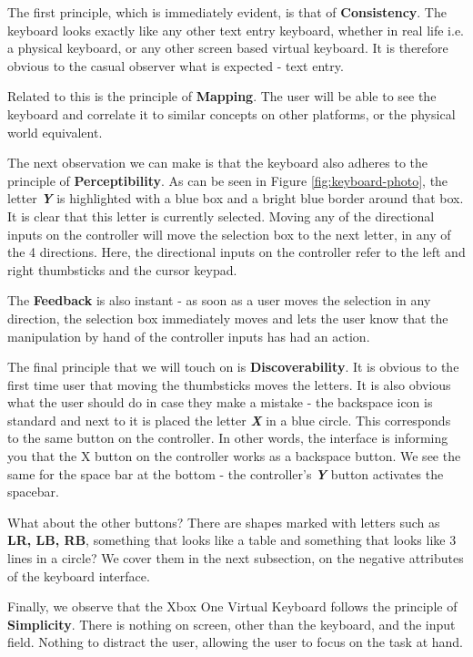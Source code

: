 \documentclass[
	letterpaper, %
]{jdf}
\begin{document}
The first principle, which is immediately evident, is that of \textbf{Consistency}. The keyboard looks exactly like any other text entry keyboard, whether in real life i.e. a physical keyboard, or any other screen based virtual keyboard. It is therefore obvious to the casual observer what is expected - text entry. 

Related to this is the principle of \textbf{Mapping}. The user will be able to see the keyboard and correlate it to similar concepts on other platforms, or the physical world equivalent.

The next observation we can make is that the keyboard also adheres to the principle of \textbf{Perceptibility}. As can be seen in Figure \ref{fig:keyboard-photo}, the letter \textbf{\textit{Y}} is highlighted with a blue box and a bright blue border around that box. It is clear that this letter is currently selected. Moving any of the directional inputs on the controller will move the selection box to the next letter, in any of the 4 directions. Here, the directional inputs on the controller refer to the left and right thumbsticks and the cursor keypad.

The \textbf{Feedback} is also instant - as soon as a user moves the selection in any direction, the selection box immediately moves and lets the user know that the manipulation by hand of the controller inputs has had an action.

The final principle that we will touch on is \textbf{Discoverability}. It is obvious to the first time user that moving the thumbsticks moves the letters. It is also obvious what the user should do in case they make a mistake - the backspace icon is standard and next to it is placed the letter \textbf{\textit{X}} in a blue circle. This corresponds to the same button on the controller. In other words, the interface is informing you that the X button on the controller works as a backspace button. We see the same for the space bar at the bottom - the controller's \textbf{\textit{Y}} button activates the spacebar.

What about the other buttons? There are shapes marked with letters such as \textbf{LR, LB, RB}, something that looks like a table and something that looks like 3 lines in a circle? We cover them in the next subsection, on the negative attributes of the keyboard interface.

Finally, we observe that the Xbox One Virtual Keyboard follows the principle of \textbf{Simplicity}. There is nothing on screen, other than the keyboard, and the input field. Nothing to distract the user, allowing the user to focus on the task at hand.
\end{document}
